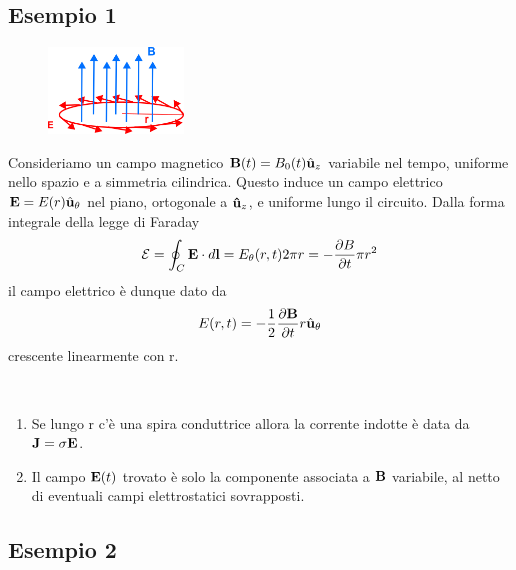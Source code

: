 \subsection{Esempio 1 }
\begin{figure}  %
    \centering
    \includegraphics[width=0.32\textwidth]{images/change_field} %
\end{figure}

Consideriamo un campo magnetico $\bold{B}(t) = B_0(t) \hat{\bold{u}}_z$ variabile nel tempo, uniforme nello spazio e a simmetria cilindrica. Questo induce un campo elettrico $\bold{E}= E(r) \hat{\bold{u}}_{\theta}$ nel piano,  ortogonale a $\bold{\hat{u}}_z$, e uniforme lungo il circuito. Dalla forma integrale della legge di Faraday
\begin{equation*}
	\mathcal{E} = \oint_{C} \bold{E} \cdot d \bold{l} = E_{\theta}(r,t) 2 \pi r = - \frac{\partial B}{\partial t} \pi r^2 
\end{equation*}
il campo elettrico  \`e dunque dato da 
\begin{equation*}
	E(r,t) = - \frac{1}{2} \frac{\partial \bold{B}}{\partial t} r \hat{\bold{u}}_{\theta} 
\end{equation*}
crescente linearmente con r.

\begin{remark}
\
\begin{enumerate}
	\item Se lungo r c'\`e una spira conduttrice 	 allora la corrente indotte \`e data da $\bold{J} = \sigma \bold{E}$.
	\item Il campo $\bold{E}(t)$ trovato \`e solo la componente associata a $\bold{B}$ variabile, al netto di eventuali campi elettrostatici sovrapposti.
\end{enumerate}
\end{remark}

\subsection{Esempio 2}

